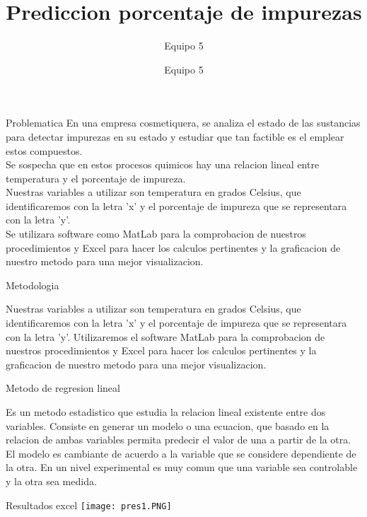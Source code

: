 \documentclass[12pt]{beamer}
\author{Equipo 5}
\author{Equipo 5}
\title{Prediccion porcentaje de impurezas}
\begin{document}
\begin{frame}
\titlepage
\end{frame}



\begin{frame}{Problematica}
En una empresa cosmetiquera, se analiza el estado de las sustancias para detectar impurezas en su estado y estudiar que tan factible es el emplear estos compuestos.
\\

Se sospecha que en estos procesos quimicos hay una relacion lineal entre temperatura y el porcentaje de impureza.
\\

Nuestras variables a utilizar son temperatura en grados Celsius, que identificaremos con
la letra 'x' y el porcentaje de impureza que se representara con la letra 'y'.
\\

Se utilizara software como MatLab para la comprobacion de nuestros procedimientos y Excel para hacer los calculos pertinentes y la graficacion de nuestro metodo para una
mejor visualizacion.

\end{frame}

\begin{frame}{Metodologia}

Nuestras variables a utilizar son temperatura en
grados Celsius, que identificaremos con la letra
'x' y el porcentaje de impureza que se
representara con la letra 'y'.
Utilizaremos el software MatLab para la
comprobacion de nuestros procedimientos y
Excel para hacer los calculos pertinentes y la
graficacion de nuestro metodo para una mejor
visualizacion.

\end{frame}


\begin{frame}{Metodo de regresion lineal}

Es un metodo estadistico que estudia la relacion lineal
existente entre dos variables. Consiste en generar un modelo o
una ecuacion, que basado en la relacion de ambas variables
permita predecir el valor de una a partir de la otra. El modelo es
cambiante de acuerdo a la variable que se considere
dependiente de la otra. En un nivel experimental es muy comun
que una variable sea controlable y la otra sea medida.

\end{frame}

\begin{frame}{Resultados excel}
\texttt{[image: pres1.PNG]} 

\end{frame}
\end{document}
